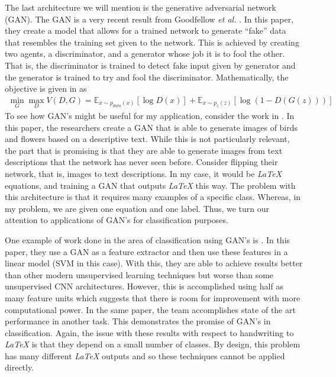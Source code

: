 \documentclass[12pt]{article}
\theoremstyle{colon}
\begin{document}
The last architecture we will mention is the generative adversarial network (GAN). The GAN is a very recent result from Goodfellow \textit{et al.} \cite{1406.2661}. In this paper, they create a model that allows for a trained network to generate ``fake'' data that resembles the training set given to the network. This is achieved by creating two agents, a discriminator, and a generator whose job it is to fool the other. That is, the discriminator is trained to detect fake input given by generator and the generator is trained to try and fool the discriminator. Mathematically, the objective is given in \cite{1406.2661} as
\begin{gather*}
  \min_G \max_D V(D,G) = \mathbb{E}_{x \sim p_{data} (x)} [\log D(x)] + \mathbb{E}_{x \sim p_z (z)} [\log (1-D(G(z)))] \
\end{gather*}
To see how GAN's might be useful for my application, consider the work in \cite{reed2016generative}. In this paper, the researchers create a GAN that is able to generate images of birds and flowers based on a descriptive text. While this is not particularly relevant, the part that is promising is that they are able to generate images from text descriptions that the network has never seen before. Consider flipping their network, that is, images to text descriptions. In my case, it would be \emph{LaTeX} equations, and training a GAN that outputs \emph{LaTeX} this way. The problem with this architecture is that it requires many examples of a specific class. Whereas, in my problem, we are given one equation and one label. Thus, we turn our attention to applications of GAN's for classification purposes.

One example of work done in the area of classification using GAN's is \cite{1511.06434}. In this paper, they use a GAN as a feature extractor and then use these features in a linear model (SVM in this case). With this, they are able to achieve results better than other modern unsupervised learning techniques but worse than some unsupervised CNN architectures. However, this is accomplished using half as many feature units which suggests that there is room for improvement with more computational power. In the same paper, the team accomplishes state of the art performance in another task. This demonstrates the promise of GAN's in classification. Again, the issue with these results with respect to handwriting to \emph{LaTeX} is that they depend on a small number of classes. By design, this problem has many different \emph{LaTeX} outputs and so these techniques cannot be applied directly.
\end{document}

